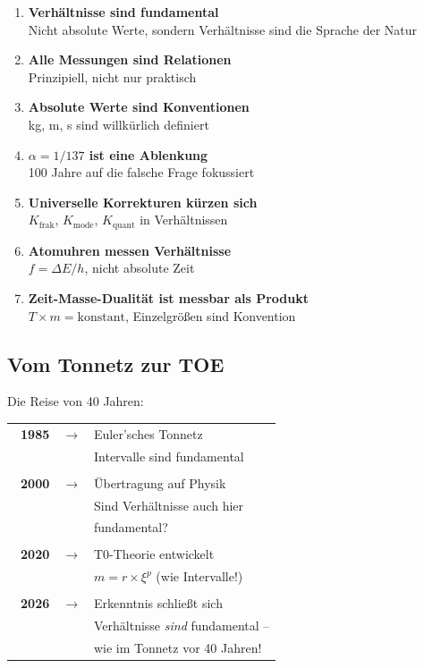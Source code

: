 \begin{enumerate}
	\item \textbf{Verhältnisse sind fundamental} \\
	Nicht absolute Werte, sondern Verhältnisse sind die Sprache der Natur
	
	\item \textbf{Alle Messungen sind Relationen} \\
	Prinzipiell, nicht nur praktisch
	
	\item \textbf{Absolute Werte sind Konventionen} \\
	kg, m, s sind willkürlich definiert
	
	\item \textbf{$\alpha = 1/137$ ist eine Ablenkung} \\
	100 Jahre auf die falsche Frage fokussiert
	
	\item \textbf{Universelle Korrekturen kürzen sich} \\
	$K_\text{frak}$, $K_\text{mode}$, $K_\text{quant}$ in Verhältnissen
	
	\item \textbf{Atomuhren messen Verhältnisse} \\
	$f = \Delta E / h$, nicht absolute Zeit
	
	\item \textbf{Zeit-Masse-Dualität ist messbar als Produkt} \\
	$T \times m = \text{konstant}$, Einzelgrößen sind Konvention
\end{enumerate}

\subsection{Vom Tonnetz zur TOE}

Die Reise von 40 Jahren:

\begin{center}
	\begin{tabular}{rcl}
		\textbf{~1985} & $\longrightarrow$ & Euler'sches Tonnetz \\
		&  & Intervalle sind fundamental \\
		&  & \\
		\textbf{~2000} & $\longrightarrow$ & Übertragung auf Physik \\
		&  & Sind Verhältnisse auch hier
		\\
		&  &  fundamental? \\
		&  & \\
		\textbf{~2020} & $\longrightarrow$ & T0-Theorie entwickelt \\
		&  & $m = r \times \xi^p$ (wie Intervalle!) \\
		&  & \\
		\textbf{2026} & $\longrightarrow$ & Erkenntnis schließt sich \\
		&  & Verhältnisse \textit{sind} fundamental -- \\
		&  & wie im Tonnetz vor 40 Jahren! \\
	\end{tabular}
\end{center}

